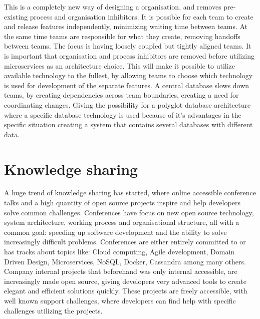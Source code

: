 This is a completely new way of designing a organisation, and removes pre-existing process and organisation inhibitors. It is possible for each team to create and release features independently, minimizing waiting time between teams. At the same time teams are responsible for what they create, removing handoffs between teams. The focus is having loosely coupled but tightly aligned teams\cite{kniberg2014spotify}.
It is important that organisation and process inhibitors are removed before utilizing microservices as an architecture choice\cite{meshenberg2016microservices}. This will make it possible to utilize available technology to the fullest, by allowing teams to choose which technology is used for development of the separate features\cite{fowler2014polyglot}. A central database slows down teams, by creating dependencies across team boundaries, creating a need for coordinating changes. Giving the possibility for a polyglot database architecture where a specific database technology is used because of it's advantages in the specific situation creating a system that contains several databases with different data\cite{george2016it, fowler2014microservices}.


\section{Knowledge sharing}
A huge trend of knowledge sharing has started, where online accessible conference talks and a high quantity of open source projects inspire and help developers solve common challenges. Conferences have focus on new open source technology, system architecture, working process and organisational structure, all with a common goal: speeding up software development and the ability to solve increasingly difficult problems. Conferences are either entirely committed to or has tracks about topics like: Cloud computing, Agile development, Domain Driven Design, Microservices, NoSQL, Docker, Cassandra among many others\cite{george2016it}. Company internal projects that beforehand was only internal accessible, are increasingly made open source, giving developers very advanced tools to create elegant and efficient solutions quickly. These projects are freely accessible, with well known support challenges, where developers can find help with specific challenges utilizing the projects.

